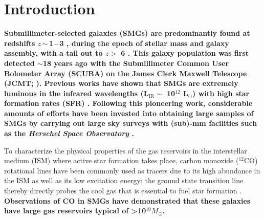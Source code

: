 \documentclass[iop]{emulateapj}
\newcommand{\Msun}{\mbox{$M_{\odot}$}}
\newcommand{\Lsun}{\mbox{L$_{\odot}$}}
\newcommand{\eg}{{\sl e.g.,~}}
\newcommand{\pmOne}{\mbox{$^{-1}$}}
\begin{document}
\section{Introduction}\label{sec:intro}
{\bf Submillimeter-selected galaxies (SMGs) are predominantly found at redshifts $z$\,$\sim$\,1\,--\,3 \citep{Chapman05a}, during the epoch of stellar mass and
galaxy assembly, with a tail out to $z>$ 6 \citep{Riechers13a}. This galaxy population was first detected 
$\sim$18 years ago with the Submillimeter Common User Bolometer Array (SCUBA) on the James
Clerk Maxwell Telescope (JCMT; \citealt{Smail97a, Hughes98a, Barger98a}). 
Previous works %
have shown that SMGs
 are extremely luminous in the infrared
 wavelengths (L$_\textrm{IR} \sim$ 10$^{12}$ \Lsun) with high star formation rates (SFR) \citep[$\gtrsim $ 500 \Msun yr\pmOne; see \eg reviews by][]{Lagache05a,Casey14a}.  Following this pioneering work, considerable amounts of efforts have been invested into 
obtaining large samples of SMGs by carrying out
  large sky surveys with (sub)-mm facilities such as the {\it Herschel Space Observatory} \citep[\eg H-ATLAS, SPT, HerMES; ][]{Eales10a,Carlstrom11a,Oliver12a}.  
  }
  
  To characterize the physical properties of the gas reservoirs in the interstellar medium (ISM) where active star formation takes place, carbon monoxide ($^{12}$CO) rotational lines have been commonly used as tracers due to its high abundance in the ISM as well as its low excitation energy; the ground state transition line thereby directly probes the cool gas that is essential to fuel star formation \citep[see \eg reviews by][]{Solomon05a,Carilli13a}.{ \bf Observations of CO in SMGs 
  have demonstrated that these galaxies have large gas reservoirs typical of \textgreater 10$^{10}$\Msun \citep[\eg][]{Frayer98a, Riechers11c, Neri03a, Riechers11d,Ivison11a,Bothwell13a}.}
\end{document}
